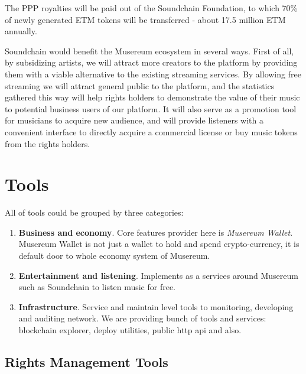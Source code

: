 \documentclass[12pt]{report}
\newcommand{\hlc}[1]{\colorbox{yellow!25}{#1}}
\begin{document}
\begin{itemize}
The PPP royalties will be paid out of the Soundchain Foundation, to which 70\% of newly generated ETM tokens will be transferred - about 17.5 million ETM annually.
 
Soundchain would benefit the Musereum ecosystem in several ways. First of all, by subsidizing artists, we will attract more creators to the platform by providing them with a viable alternative to the existing streaming services. By allowing free streaming we will attract general public to the platform, and the statistics gathered this way will help rights holders to demonstrate the value of their music to potential business users of our platform. It will also serve as a promotion tool for musicians to acquire new audience, and will provide listeners with a convenient interface to directly acquire a commercial license or buy music tokens from the rights holders.

\end{itemize}

\section{\hlc{Tools}}
\label{platform-tools}
All of tools could be grouped by three categories:
\begin{enumerate}
	\item \textbf{Business and economy}. Core features provider here is \textit{Musereum Wallet}. Musereum Wallet is not just a wallet to hold and spend crypto-currency, it is default door to whole economy system of Musereum. 
	\item \textbf{Entertainment and listening}. Implements as a services around Musereum such as Soundchain to listen music for free.
	\item \textbf{Infrastructure}. Service and maintain level tools to monitoring, developing and auditing network. We are providing bunch of tools and services: blockchain explorer, deploy utilities, public http api and also.
\end{enumerate}

\subsection{\hlc{Rights Management Tools}}
\label{platform-tools-rights}


\def\Registration{Person Registration (Author)}
\def\RegistrationMusereum{Create ETM Wallet}
\def\KYC{KYC (Proof of Identity)}
\def\CreateAsset{Create Asset}
\def\AssetTitle{Title}
\def\AssetImage{Image}
\def\AssetRelease{Release Date}
\def\AssetLanguage{Language}
\def\AssetBPM{BPM}
\def\AssetTempo{Tempo}
\def\AssetVocal{Vocal}
\def\AssetMusicalKey{Musical Key}
\def\AssetKeywords{Keywords}
\def\AssetMoods{Moods}
\def\AssetSimilar{Similar assets}
\def\AssetDescription{Description}
\def\AssetGenres{Genres}
\end{document}
